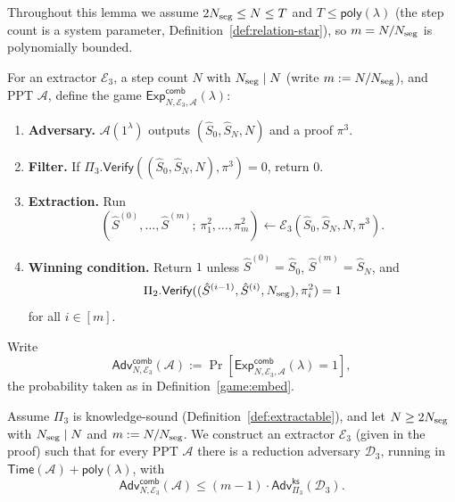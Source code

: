 Throughout this lemma we assume $2N_{\mathrm{seg}} \leq N \leq T$ and $T \leq \mathsf{poly}(\lambda)$
(the step count is a system parameter, Definition~\ref{def:relation-star}), so $m = N/N_{\mathrm{seg}}$ is polynomially bounded.

\begin{definition}\label{game:combine}
For an extractor $\mathcal{E}_3$, a step count $N$ with $N_{\mathrm{seg}}\mid N$ (write
$m:=N/N_{\mathrm{seg}}$), and PPT $\mathcal{A}$, define the game
$\mathsf{Exp}^{\mathsf{comb}}_{N,\mathcal{E}_3,\mathcal{A}}(\lambda)$:
\begin{enumerate}
  \item \textbf{Adversary.} $\mathcal{A}(1^\lambda)$ outputs
    $(\hat{S}_0,\hat{S}_N,N)$ and a proof $\pi^3$.
  \item \textbf{Filter.} If $\Pi_3.\mathsf{Verify}((\hat{S}_0,\hat{S}_N,N),\pi^3)=0$,
    return $0$.
  \item \textbf{Extraction.} Run
\[
  (\hat{S}^{(0)},\ldots,\hat{S}^{(m)};\,\pi^2_1,\ldots,\pi^2_m)
    \leftarrow\mathcal{E}_3(\hat{S}_0,\hat{S}_N,N,\pi^3).
\]
  \item \textbf{Winning condition.} Return $1$ unless
    $\hat{S}^{(0)}=\hat{S}_0$, $\hat{S}^{(m)}=\hat{S}_N$, and
\[
  \Pi_2.\mathsf{Verify}((\hat{S}^{(i-1)},\hat{S}^{(i)},N_{\mathrm{seg}}),\pi^2_i)=1
\]
for all $i\in[m]$.
\end{enumerate}
Write
\[
  \mathsf{Adv}^{\mathsf{comb}}_{N,\mathcal{E}_3}(\mathcal{A}) :=
\Pr[\mathsf{Exp}^{\mathsf{comb}}_{N,\mathcal{E}_3,\mathcal{A}}(\lambda)=1],
\]
the probability taken as in Definition~\ref{game:embed}.
\end{definition}

\begin{lemma}\label{lem:combine}
Assume $\Pi_3$ is knowledge-sound (Definition~\ref{def:extractable}), and let
$N\ge 2N_{\mathrm{seg}}$ with $N_{\mathrm{seg}}\mid N$ and $m:=N/N_{\mathrm{seg}}$. We construct an
extractor $\mathcal{E}_3$ (given in the proof) such that for every PPT $\mathcal{A}$ there is a
reduction adversary $\mathcal{D}_3$, running in
$\mathsf{Time}(\mathcal{A})+\mathsf{poly}(\lambda)$, with
\[
  \mathsf{Adv}^{\mathsf{comb}}_{N,\mathcal{E}_3}(\mathcal{A})
  \le (m-1)\cdot\mathsf{Adv}^{\mathsf{ks}}_{\Pi_3}(\mathcal{D}_3).
\]
\end{lemma}


